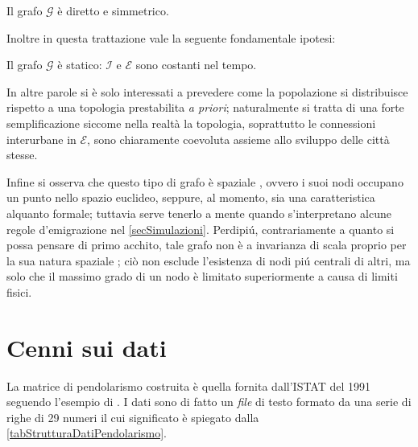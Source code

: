     \begin{ipo}
      \label{ipTipoGrafo}
      Il grafo \(\mathcal G\) è diretto e simmetrico.
    \end{ipo}

    Inoltre in questa trattazione vale la seguente fondamentale ipotesi:

    \begin{ipo}
      \label{ipGrafoStatico}
      Il grafo \(\mathcal G\) è statico: \(\mathcal I\) e \(\mathcal E\) sono costanti nel tempo.
    \end{ipo}

    In altre parole si è solo interessati a prevedere come la popolazione si distribuisce rispetto a una topologia prestabilita \textit{a priori}; naturalmente si tratta di una forte semplificazione siccome nella realtà la topologia, soprattutto le connessioni interurbane in \(\mathcal E\), sono chiaramente coevoluta assieme allo sviluppo delle città stesse.

    Infine si osserva che questo tipo di grafo è spaziale \cite{Barthelemy2011,DeMontis2007}, ovvero i suoi nodi occupano un punto nello spazio euclideo, seppure, al momento, sia una caratteristica alquanto formale; tuttavia serve tenerlo a mente quando s'interpretano alcune regole d'emigrazione nel \cref{secSimulazioni}. Perdipiú, contrariamente a quanto si possa pensare di primo acchito, tale grafo non è a invarianza di scala \cite{Barabasi1999} proprio per la sua natura spaziale \cite{Broido2019,Barthelemy2011}; ciò non esclude l'esistenza di nodi piú centrali di altri, ma solo che il massimo grado di un nodo è limitato superiormente a causa di limiti fisici.

  \section{Cenni sui dati}\label{secCenniSuiDati}

    La matrice di pendolarismo costruita è quella fornita dall'ISTAT del 1991 \cite{ISTATPendolarismo1991} seguendo l'esempio di \cite{DeMontis2007}. I dati sono di fatto un \textit{file} di testo formato da una serie di righe di 29 numeri il cui significato è spiegato dalla \cref{tabStrutturaDatiPendolarismo}.

